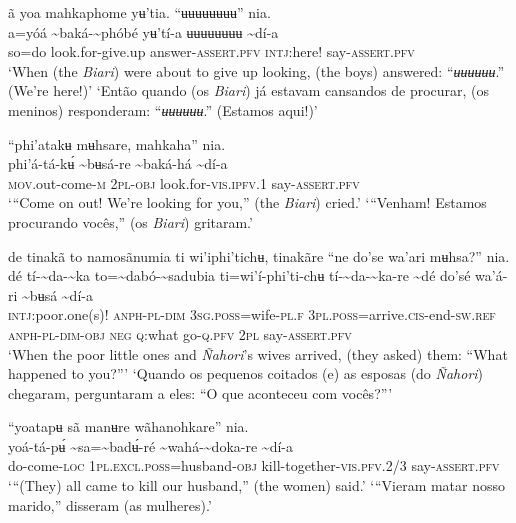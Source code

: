 \documentclass[output=paper,
modfonts,nonflat
]{langsci/langscibook}
\begin{document}
\ea ã yoa mahkaphome yʉ'tia. “ʉʉʉʉʉʉʉʉ” nia. \\[.3em]
\gll {\textasciitilde}a=yóá	{\textasciitilde}baká-{\textasciitilde}phóbé	yʉ'tí-a	ʉʉʉʉʉʉʉʉ	{\textasciitilde}dí-a \\
     so=do	look.for-give.up	answer-\textsc{assert.pfv}	\textsc{intj:}here!	say-\textsc{assert.pfv}\\
\glt ‘When (the \textit{Biari}) were about to give up looking, (the boys) answered: “\textit{ʉʉʉʉʉʉ}.” (We’re here!)'
\glt ‘Então quando (os \textit{Biari}) já estavam cansandos de procurar, (os meninos) responderam: “\textit{ʉʉʉʉʉʉ}.” (Estamos aqui!)'
\z 

\newpage
\ea “phi'atakʉ mʉhsare, mahkaha” nia. \\[.3em]
\gll phi'á-tá-kʉ́	{\textasciitilde}bʉsá-re	{\textasciitilde}baká-há	{\textasciitilde}dí-a \\
     \textsc{mov}.out-come-\textsc{m}	2\textsc{pl-obj}	look.for-\textsc{vis.ipfv.}1	say-\textsc{assert.pfv} \\
\glt ‘“Come on out! We're looking for you,” (the \textit{Biari}) cried.’
\glt ‘“Venham! Estamos procurando vocês,” (os \textit{Biari}) gritaram.’
\z 

\ea de tinakã to namosãnumia ti wi'iphi'tichʉ, tinakãre “ne do'se wa'ari mʉhsa?” nia. \\[.3em]
\gll dé	tí-{\textasciitilde}da-{\textasciitilde}ka	to={\textasciitilde}dabó-{\textasciitilde}sadubia	ti=wi'í-phi'ti-chʉ	tí-{\textasciitilde}da-{\textasciitilde}ka-re {\textasciitilde}dé	do'sé	wa'á-ri	{\textasciitilde}bʉsá	{\textasciitilde}dí-a\\
     \textsc{intj}:poor.one(s)!	\textsc{anph-pl}-\textsc{dim}	3\textsc{sg.poss}=wife-\textsc{pl.f}	3\textsc{pl.poss}=arrive\textsc{.cis}-end-\textsc{sw.ref}	\textsc{anph-pl-dim-obj} \textsc{neg}	\textsc{q:}what	go-\textsc{q.pfv}	2\textsc{pl}	say-\textsc{assert.pfv}\\
\glt ‘When the poor little ones and \textit{Ñahori}'s wives arrived, (they asked) them: “What happened to you?”’
\glt ‘Quando os pequenos coitados (e) as esposas (do \textit{Ñahori}) chegaram, perguntaram a eles: “O que aconteceu com vocês?”’
\z 

\ea “yoatapʉ sã manʉre wãhanohkare” nia. \\[.3em]
\gll yoá-tá-pʉ́	{\textasciitilde}sa={\textasciitilde}badʉ́-ré	{\textasciitilde}wahá-{\textasciitilde}doka-re	{\textasciitilde}dí-a \\
     do-come-\textsc{loc}	1\textsc{pl.excl.poss}=husband\textsc{-obj}	kill-together-\textsc{vis.pfv.}2/3	say-\textsc{assert.pfv}\\
\glt ‘“(They) all came to kill our husband,” (the women) said.’
\glt ‘“Vieram matar nosso marido,” disseram (as mulheres).’
\z 
\end{document}
